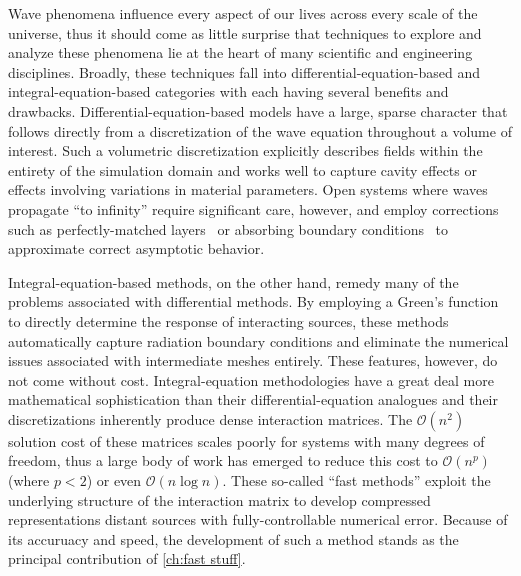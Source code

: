 Wave phenomena influence every aspect of our lives across every scale of the universe, thus it should come as little surprise that techniques to explore and analyze these phenomena lie at the heart of many scientific and engineering disciplines.
Broadly, these techniques fall into differential-equation-based and integral-equation-based categories with each having several benefits and drawbacks.
Differential-equation-based models have a large, sparse character that follows directly from a discretization of the wave equation throughout a volume of interest.
Such a volumetric discretization explicitly describes fields within the entirety of the simulation domain and works well to capture cavity effects or effects involving variations in material parameters.
Open systems where waves propagate ``to infinity'' require significant care, however, and employ corrections such as perfectly-matched layers~\cite{Berenger1994} or absorbing boundary conditions~\cite{Mur1981} to approximate correct asymptotic behavior.

Integral-equation-based methods, on the other hand, remedy many of the problems associated with differential methods.
By employing a Green's function to directly determine the response of interacting sources, these methods automatically capture radiation boundary conditions and eliminate the numerical issues associated with intermediate meshes entirely.
These features, however, do not come without cost.
Integral-equation methodologies have a great deal more mathematical sophistication than their differential-equation analogues and their discretizations inherently produce dense interaction matrices.
The $\mathcal{O}(n^2)$ solution cost of these matrices scales poorly for systems with many degrees of freedom, thus a large body of work has emerged to reduce this cost to $\mathcal{O}(n^p)$ (where $p < 2$) or even $\mathcal{O}(n \log n)$.
These so-called ``fast methods'' exploit the underlying structure of the interaction matrix to develop compressed representations distant sources with fully-controllable numerical error.
Because of its accuruacy and speed, the development of such a method stands as the principal contribution of \cref{ch:fast stuff}.
